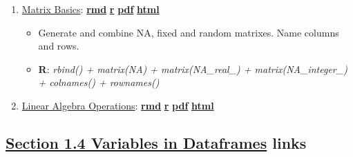 \documentclass[
]{book}
\providecommand{\tightlist}{%
  \setlength{\itemsep}{0pt}\setlength{\parskip}{0pt}}
\begin{document}
\begin{enumerate}
\def\labelenumi{\arabic{enumi}.}
\tightlist
\item
  \href{https://fanwangecon.github.io/R4Econ/amto/matrix/htmlpdfr/fs_mat_generate.html}{Matrix Basics}: \href{https://github.com/FanWangEcon/R4Econ/blob/master/amto/matrix//fs_mat_generate.Rmd}{\textbf{rmd}} \textbar{} \href{https://github.com/FanWangEcon/R4Econ/blob/master/amto/matrix/htmlpdfr/fs_mat_generate.R}{\textbf{r}} \textbar{} \href{https://github.com/FanWangEcon/R4Econ/blob/master/amto/matrix/htmlpdfr/fs_mat_generate.pdf}{\textbf{pdf}} \textbar{} \href{https://fanwangecon.github.io/R4Econ/amto/matrix/htmlpdfr/fs_mat_generate.html}{\textbf{html}}

  \begin{itemize}
  \tightlist
  \item
    Generate and combine NA, fixed and random matrixes. Name columns and rows.
  \item
    \textbf{R}: \emph{rbind() + matrix(NA) + matrix(NA\_real\_) + matrix(NA\_integer\_) + colnames() + rownames()}
  \end{itemize}
\item
  \href{https://fanwangecon.github.io/R4Econ/amto/matrix/htmlpdfr/fs_mat_linear_algebra.html}{Linear Algebra Operations}: \href{https://github.com/FanWangEcon/R4Econ/blob/master/amto/matrix//fs_mat_linear_algebra.Rmd}{\textbf{rmd}} \textbar{} \href{https://github.com/FanWangEcon/R4Econ/blob/master/amto/matrix/htmlpdfr/fs_mat_linear_algebra.R}{\textbf{r}} \textbar{} \href{https://github.com/FanWangEcon/R4Econ/blob/master/amto/matrix/htmlpdfr/fs_mat_linear_algebra.pdf}{\textbf{pdf}} \textbar{} \href{https://fanwangecon.github.io/R4Econ/amto/matrix/htmlpdfr/fs_mat_linear_algebra.html}{\textbf{html}}
\end{enumerate}

\hypertarget{section-1.4-variables-in-dataframesvariables-in-dataframes-links}{%
\subsection{\texorpdfstring{\protect\hyperlink{variables-in-dataframes}{Section 1.4 Variables in Dataframes} links}{Section 1.4 Variables in Dataframes links}}\label{section-1.4-variables-in-dataframesvariables-in-dataframes-links}}
\end{document}
